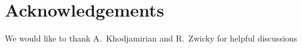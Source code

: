 \documentclass[12pt,a4paper]{article}
\begin{document}
\renewcommand{\thefootnote}{\fnsymbol{footnote}}
\setcounter{footnote}{1}



\renewcommand{\thefootnote}{\arabic{footnote}}
\setcounter{footnote}{0}
\tableofcontents
\cleardoublepage



\pagestyle{plain} %
\setcounter{page}{1}


% 





\section*{Acknowledgements}
We would like to thank A.~Khodjamirian and R.~Zwicky for
helpful discussions 
\clearpage



%
\end{document}

